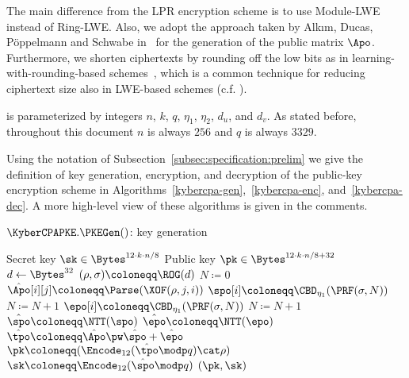 The main difference from the LPR encryption scheme 
is to use Module-LWE instead of Ring-LWE. 
Also, we adopt the approach taken by Alk{\i}m, Ducas, Pöppelmann and Schwabe in~\cite{ADPS16}
for the generation of the public matrix $\Apo$.
Furthermore, we shorten ciphertexts by rounding off
the low bits as in learning-with-rounding-based schemes~\cite[Eq.~2.1]{banerjee2012pseudorandom}, 
which is a common technique for reducing ciphertext size also in LWE-based schemes (c.f. \cite{Pei09b,Poppelmann2013hwrlwe}).

\KyberCPAPKE is parameterized by integers $n$, $k$, $q$, $\eta_1$, $\eta_2$, $d_u$, and $d_v$.
As stated before, throughout this document $n$ is always $256$ and $q$ is always $3329$.

Using the notation of Subsection~\ref{subsec:specification:prelim} we give the definition of key generation, encryption, and decryption
of the \KyberCPAPKE public-key encryption scheme in Algorithms~\ref{kybercpa-gen},~\ref{kybercpa-enc}, and~\ref{kybercpa-dec}.
A more high-level view of these algorithms is given in the comments.

\begin{algorithm}
  \caption{$\KyberCPAPKE.\PKEGen()$: key generation
  \label{kybercpa-gen}}
  \begin{algorithmic}[1]
    \Ensure Secret key $\sk \in \Bytes^{12\cdot k\cdot n/8}$
    \Ensure Public key $\pk \in \Bytes^{12\cdot k\cdot n/8 + 32}$
    \State $d \gets \Bytes^{32}$                  \label{line:secretrandomness}
    \State $(\rho, \sigma) \coloneqq \ROG(d)$ 
    \State $N \coloneqq 0$
               
      \State $\hat{\Apo}[i][j] \coloneqq \Parse(\XOF(\rho, j, i))$
    \EndFor
    \EndFor
               
    \State $\spo[i] \coloneqq \CBD_{\eta_1}(\PRF(\sigma, N))$
    \State $N \coloneqq N+1$
    \EndFor
               
    \State $\epo[i] \coloneqq \CBD_{\eta_1}(\PRF(\sigma, N))$
    \State $N \coloneqq N+1$
    \EndFor
    \State $\hat{\spo} \coloneqq \NTT(\spo)$\label{line:kybercpa-gen:ntts}
    \State $\hat{\epo} \coloneqq \NTT(\epo)$
    \State $\hat{\tpo} \coloneqq \hat{\Apo} \pw \hat{\spo} + \hat{\epo}$\label{line:kybercpa-gen:invnttas}
    \State $\pk \coloneqq (\Encode_{12}(\hat{\tpo} \modp q)\cat\rho)$\Comment{$\pk \coloneqq \Apo\spo + \epo$}
    \State $\sk \coloneqq \Encode_{12}(\hat{\spo} \modp q)$\Comment{$\sk \coloneqq \spo$}
    \State \Return $(\pk, \sk)$
  \end{algorithmic}
\end{algorithm}


